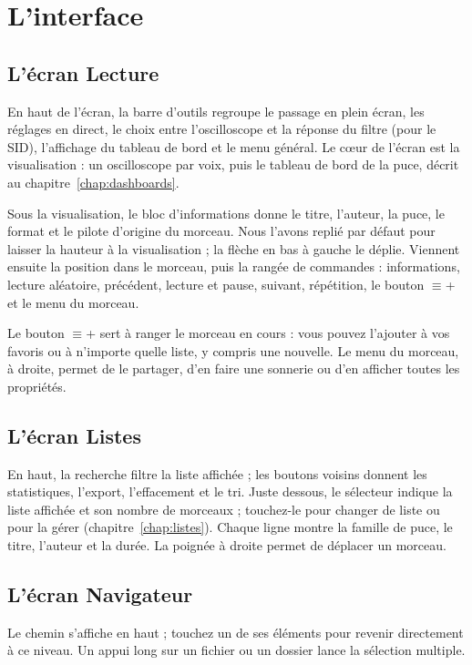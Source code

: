 \chapter{L'interface}

\section{L'écran Lecture}

En haut de l'écran, la barre d'outils regroupe le passage en plein écran, les réglages en direct, le choix entre
l'oscilloscope et la réponse du filtre (pour le SID), l'affichage du tableau de bord et le menu général. Le cœur de
l'écran est la visualisation : un oscilloscope par voix, puis le tableau de bord de la puce, décrit au
chapitre~\ref{chap:dashboards}.

Sous la visualisation, le bloc d'informations donne le titre, l'auteur, la puce, le format et le pilote d'origine du
morceau. Nous l'avons replié par défaut pour laisser la hauteur à la visualisation ; la flèche en bas à gauche le
déplie. Viennent ensuite la position dans le morceau, puis la rangée de commandes : informations, lecture
aléatoire, précédent, lecture et pause, suivant, répétition, le bouton $\equiv$+ et le menu du morceau.

Le bouton $\equiv$+ sert à ranger le morceau en cours : vous pouvez l'ajouter à vos favoris ou à n'importe quelle
liste, y compris une nouvelle. Le menu du morceau, à droite, permet de le partager, d'en faire une sonnerie ou d'en
afficher toutes les propriétés.


\section{L'écran Listes}
En haut, la recherche filtre la liste affichée ; les boutons voisins donnent les statistiques, l'export, l'effacement
et le tri. Juste dessous, le sélecteur indique la liste affichée et son nombre de morceaux ; touchez-le pour changer
de liste ou pour la gérer (chapitre~\ref{chap:listes}). Chaque ligne montre la famille de puce, le titre, l'auteur et
la durée. La poignée à droite permet de déplacer un morceau.

\section{L'écran Navigateur}
Le chemin s'affiche en haut ; touchez un de ses éléments pour revenir directement à ce niveau. Un appui long sur un
fichier ou un dossier lance la sélection multiple.

